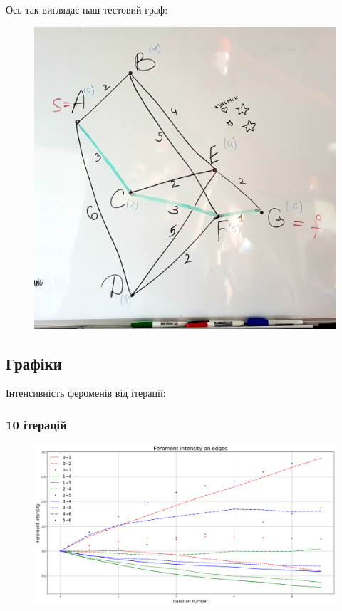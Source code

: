\documentclass[a4paper, 12pt]{article}
\numberwithin{equation}{section}
\begin{document}
Ось так виглядає наш тестовий граф:
\begin{figure}[H]
    \centering
    \includegraphics[width=\textwidth]{../../code/salesman/graph.jpg}
\end{figure}

\subsection{Графіки}

Інтенсивність фероменів від ітерації:

\subsubsection{10 ітерацій}

\begin{figure}[H]
    \centering
    \includegraphics[width=\textwidth]{../../code/salesman/feroment_10.png}
\end{figure}
\end{document}
